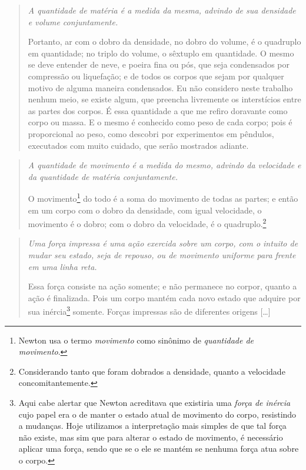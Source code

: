 \begin{quote}
\emph{A quantidade de matéria é a medida da mesma, advindo de sua densidade e volume conjuntamente.}
  
Portanto, ar com o dobro da densidade, no dobro do volume, é o quadruplo em quantidade; no triplo do volume, o sêxtuplo em quantidade. O mesmo se deve entender de neve, e poeira fina ou pós, que seja condensados por compressão ou liquefação; e de todos os corpos que sejam por qualquer motivo de alguma maneira condensados. Eu não considero neste trabalho nenhum meio, se existe algum, que preencha livremente os interstícios entre as partes dos corpos. É essa quantidade a que me refiro doravante como corpo ou massa. E o mesmo é conhecido como peso de cada corpo; pois é proporcional ao peso, como descobri por experimentos em pêndulos, executados com muito cuidado, que serão mostrados adiante.
\end{quote}

\begin{quote}
\emph{A quantidade de movimento é a medida do mesmo, advindo da velocidade e da quantidade de matéria conjuntamente.}

O movimento\footnote{Newton usa o termo \emph{movimento} como sinônimo de \emph{quantidade de movimento}.} do todo é a soma do movimento de todas as partes; e então em um corpo com o dobro da densidade, com igual velocidade, o movimento é o dobro; com o dobro da velocidade, é o quadruplo.\footnote{Considerando tanto que foram dobrados a densidade, quanto a velocidade concomitantemente.}
\end{quote}

\begin{quote}
\emph{Uma força impressa é uma ação exercida sobre um corpo, com o intuito de mudar seu estado, seja de repouso, ou de movimento uniforme para frente em uma linha reta.}

Essa força consiste na ação somente; e não permanece no corpor, quanto a ação é finalizada. Pois um corpo mantém cada novo estado que adquire por sua inércia\footnote{Aqui cabe alertar que Newton acreditava que existiria uma \emph{força de inércia} cujo papel era o de manter o estado atual de movimento do corpo, resistindo a mudanças. Hoje utilizamos a interpretação mais simples de que tal força não existe, mas sim que para alterar o estado de movimento, é necessário aplicar uma força, sendo que se o ele se mantém se nenhuma força atua sobre o corpo.} somente. Forças impressas são de diferentes origens [\dots]
\end{quote}

